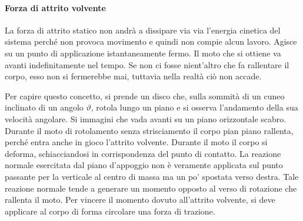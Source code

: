 \documentclass[10pt,a4paper]{book}
\begin{document}
\paragraph{Forza di attrito volvente} La forza di attrito statico non andrà a dissipare via via l'energia cinetica del sistema perché non provoca movimento e quindi non compie alcun lavoro. Agisce su un punto di applicazione istantaneamente fermo. Il moto che si ottiene va avanti indefinitamente nel tempo. Se non ci fosse nient'altro che fa rallentare il corpo, esso non si fermerebbe mai, tuttavia nella realtà ciò non accade.

Per capire questo concetto, si prende un disco che, sulla sommità di un cuneo inclinato di un angolo $\vartheta$, rotola lungo un piano e si osserva l'andamento della sua velocità angolare. Si immagini che vada avanti su un piano orizzontale scabro. Durante il moto di rotolamento senza strisciamento il corpo pian piano rallenta,  perché entra anche in gioco l'attrito volvente. Durante il moto il corpo si deforma, schiacciandosi in corrispondenza del punto di contatto. La reazione normale esercitata dal piano d'appoggio non è veramente applicata sul punto passante per la verticale al centro di massa ma un po' spostata verso destra. Tale reazione normale tende a generare un momento opposto al verso di rotazione che rallenta il moto. Per vincere il momento dovuto all'attrito volvente, si deve applicare al corpo di forma circolare una forza di trazione.
\end{document}

